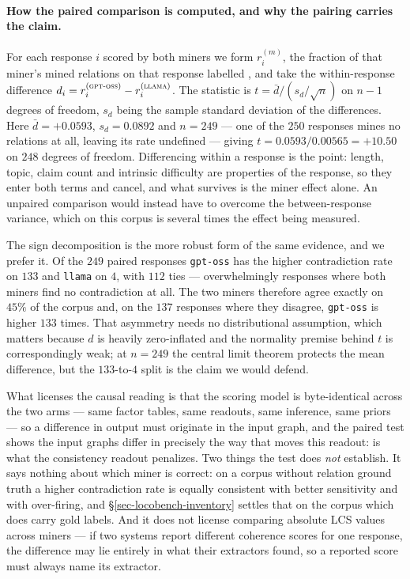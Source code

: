 \paragraph{How the paired comparison is computed, and why the pairing carries the claim.} For each
response $i$ scored by both miners we form $r_i^{(m)}$, the fraction of that miner's mined relations on
that response labelled , and take the within-response difference
$d_i = r_i^{(\textsc{gpt-oss})} - r_i^{(\textsc{llama})}$. The statistic is
$t = \bar{d} / (s_d/\sqrt{n})$ on $n-1$ degrees of freedom, $s_d$ being the sample standard deviation of
the differences. Here $\bar{d} = +0.0593$, $s_d = 0.0892$ and $n = 249$ --- one of the $250$ responses
mines no relations at all, leaving its rate undefined --- giving $t = 0.0593/0.00565 = +10.50$ on $248$
degrees of freedom. Differencing within a response is the point: length, topic, claim count and
intrinsic difficulty are properties of the response, so they enter both terms and cancel, and what
survives is the miner effect alone. An unpaired comparison would instead have to overcome the
between-response variance, which on this corpus is several times the effect being measured.

The sign decomposition is the more robust form of the same evidence, and we prefer it. Of the $249$
paired responses \texttt{gpt-oss} has the higher contradiction rate on $133$ and \texttt{llama} on $4$,
with $112$ ties --- overwhelmingly responses where both miners find no contradiction at all. The two
miners therefore agree exactly on $45\%$ of the corpus and, on the $137$ responses where they disagree,
\texttt{gpt-oss} is higher $133$ times. That asymmetry needs no distributional assumption, which matters
because $d$ is heavily zero-inflated and the normality premise behind $t$ is correspondingly weak; at
$n = 249$ the central limit theorem protects the mean difference, but the $133$-to-$4$ split is the
claim we would defend.

What licenses the causal reading is that the scoring model is byte-identical across the two arms ---
same factor tables, same readouts, same inference, same priors --- so a difference in output must
originate in the input graph, and the paired test shows the input graphs differ in precisely the way
that moves this readout:  is what the consistency readout penalizes. Two things
the test does \emph{not} establish. It says nothing about which miner is correct: on a corpus without
relation ground truth a higher contradiction rate is equally consistent with better sensitivity and with
over-firing, and \S\ref{sec-locobench-inventory} settles that on the corpus which does carry gold
labels. And it does not license comparing absolute LCS values across miners --- if two systems report
different coherence scores for one response, the difference may lie entirely in what their extractors
found, so a reported score must always name its extractor.


